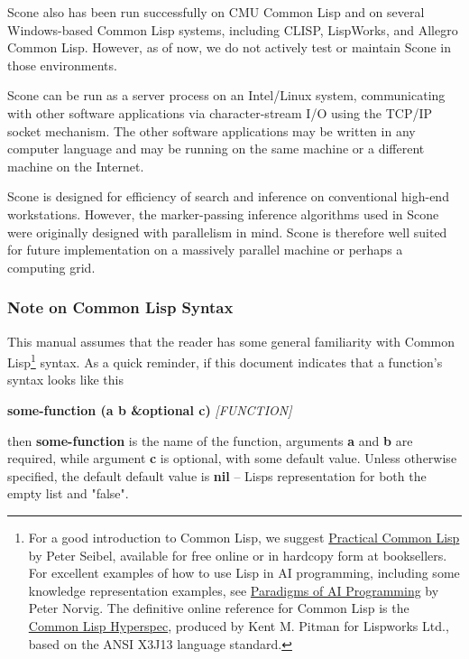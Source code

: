 \documentclass[titlepage,twoside,openright,11pt]{article}
\begin{document}
Scone also has been run successfully on CMU Common Lisp and on several
Windows-based Common Lisp systems, including CLISP, LispWorks, and
Allegro Common Lisp. However, as of now, we do not actively test or
maintain Scone in those environments.

Scone can be run as a server process on an Intel/Linux system,
communicating with other software applications via character-stream I/O
using the TCP/IP socket mechanism. The other software applications may
be written in any computer language and may be running on the same
machine or a different machine on the Internet.

Scone is designed for efficiency of search and inference on conventional
high-end workstations. However, the marker-passing inference algorithms
used in Scone were originally designed with parallelism in mind. Scone
is therefore well suited for future implementation on a massively
parallel machine or perhaps a computing grid.

\subsubsection{Note on Common Lisp
Syntax}\label{note-on-common-lisp-syntax}

This manual assumes that the reader has some general familiarity with
Common Lisp\footnote{For a good introduction to Common Lisp, we suggest
  \href{http://www.gigamonkeys.com/book/}{Practical Common Lisp} by
  Peter Seibel, available for free online or in hardcopy form at
  booksellers. For excellent examples of how to use Lisp in AI
  programming, including some knowledge representation examples, see
  \href{http://norvig.com/paip.html}{Paradigms of AI Programming} by
  Peter Norvig. The definitive online reference for Common Lisp is the
  \href{http://www.lispworks.com/documentation/HyperSpec/Front/}{Common
  Lisp Hyperspec}, produced by Kent M. Pitman for Lispworks Ltd., based
  on the ANSI X3J13 language standard.} syntax. As a quick reminder, if
this document indicates that a function's syntax looks like this

\textbf{some-function (a b \&optional c)} \emph{{[}FUNCTION{]}}

then \textbf{some-function} is the name of the function, arguments
\textbf{a} and \textbf{b} are required, while argument \textbf{c} is
optional, with some default value. Unless otherwise specified, the
default default value is \textbf{nil} -- Lisp\textquotesingle s
representation for both the empty list and "false".
\end{document}
